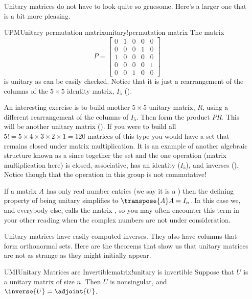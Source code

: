 %
%
Unitary matrices do not have to look quite so gruesome.  Here's a larger one that is a bit more pleasing.
%
\begin{example}{UPM}{Unitary permutation matrix}{unitary!permutation matrix}
The matrix
%
\begin{equation*}
P=
\begin{bmatrix}
0&1&0&0&0\\
0&0&0&1&0\\
1&0&0&0&0\\
0&0&0&0&1\\
0&0&1&0&0
\end{bmatrix}
\end{equation*}
%
is unitary as can be easily checked.  Notice that it is just a rearrangement of the columns of the $5\times 5$ identity matrix, $I_5$ ().\par
%
An interesting exercise is to build another $5\times 5$ unitary matrix, $R$, using a different rearrangement of the columns of $I_5$.  Then form the product $PR$.  This will be another unitary matrix ().  If you were to build all $5!=5\times 4\times 3\times 2\times 1=120$ matrices of this type you would have a set that remains closed under matrix multiplication.  It is an example of another algebraic structure known as a  since together the set and the one operation (matrix multiplication here) is closed, associative, has an identity ($I_5$), and inverses ().  Notice though that the operation in this group is not commutative!
%
\end{example}
%
If a matrix $A$ has only real number entries (we say it is a ) then the defining property of being unitary simplifies to $\transpose{A}A=I_n$.  In this case we, and everybody else, calls the matrix , so you may often encounter this term in your other reading when the complex numbers are not under consideration.\par
%
Unitary matrices have easily computed inverses.  They also have columns that form orthonormal sets.  Here are the theorems that show us that unitary matrices are not as strange as they might initially appear.
%
\begin{theorem}{UMI}{Unitary Matrices are Invertible}{matrix!unitary is invertible}
Suppose that $U$ is a unitary matrix of size $n$.  Then $U$ is nonsingular, and $\inverse{U}=\adjoint{U}$.
\end{theorem}
